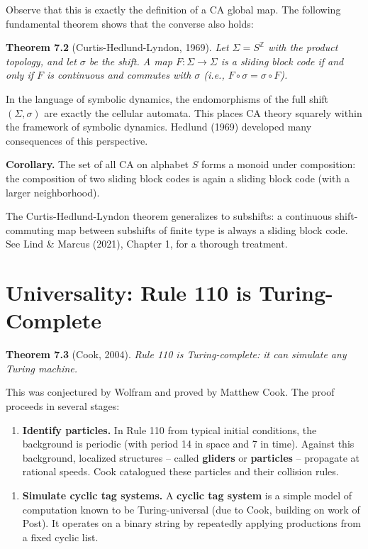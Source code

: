 Observe that this is exactly the definition of a CA global map. The following fundamental theorem shows that the converse also holds:

\textbf{Theorem 7.2} (Curtis-Hedlund-Lyndon, 1969). \textit{Let $\Sigma = S^{\mathbb{Z}}$ with the product topology, and let $\sigma$ be the shift. A map $F: \Sigma \to \Sigma$ is a sliding block code if and only if $F$ is continuous and commutes with $\sigma$ (i.e., $F \circ \sigma = \sigma \circ F$).}

In the language of symbolic dynamics, the endomorphisms of the full shift $(\Sigma, \sigma)$ are exactly the cellular automata. This places CA theory squarely within the framework of symbolic dynamics. Hedlund (1969) developed many consequences of this perspective.

\textbf{Corollary.} The set of all CA on alphabet $S$ forms a monoid under composition: the composition of two sliding block codes is again a sliding block code (with a larger neighborhood).

The Curtis-Hedlund-Lyndon theorem generalizes to subshifts: a continuous shift-commuting map between subshifts of finite type is always a sliding block code. See Lind \& Marcus (2021), Chapter 1, for a thorough treatment.


\section{Universality: Rule 110 is Turing-Complete}

\textbf{Theorem 7.3} (Cook, 2004). \textit{Rule 110 is Turing-complete: it can simulate any Turing machine.}

This was conjectured by Wolfram and proved by Matthew Cook. The proof proceeds in several stages:

\begin{enumerate}
\item \textbf{Identify particles.} In Rule 110 from typical initial conditions, the background is periodic (with period 14 in space and 7 in time). Against this background, localized structures -- called \textbf{gliders} or \textbf{particles} -- propagate at rational speeds. Cook catalogued these particles and their collision rules.
\end{enumerate}

\begin{enumerate}
\item \textbf{Simulate cyclic tag systems.} A \textbf{cyclic tag system} is a simple model of computation known to be Turing-universal (due to Cook, building on work of Post). It operates on a binary string by repeatedly applying productions from a fixed cyclic list.
\end{enumerate}


